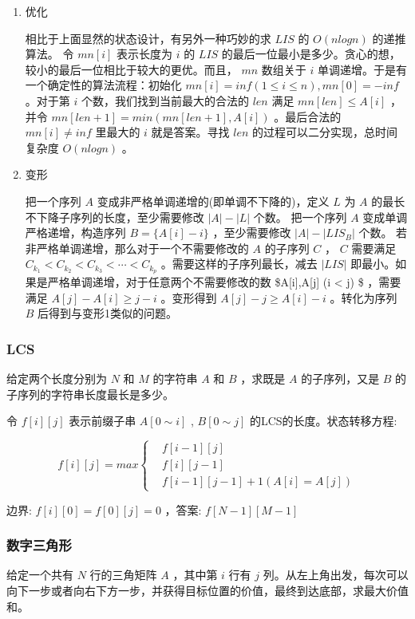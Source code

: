 \documentclass[11pt]{article}
\begin{document}
\begin{enumerate}
\item 优化
\label{sec-2-3-1-1}

相比于上面显然的状态设计，有另外一种巧妙的求 $LIS$ 的 $O(nlogn)$ 的递推算法。
令 $mn[i]$ 表示长度为 $i$ 的 $LIS$ 的最后一位最小是多少。贪心的想，较小的最后一位相比于较大的更优。而且， $mn$ 数组关于 $i$ 单调递增。于是有一个确定性的算法流程：初始化 $mn[i]=inf(1 \leq i \leq n),mn[0]=-inf$ 。对于第 $i$ 个数，我们找到当前最大的合法的 $len$ 满足 $mn[len] \leq A[i]$ ，并令 $mn[len+1]=min(mn[len+1],A[i])$ 。最后合法的 $mn[i] \neq inf$ 里最大的 $i$ 就是答案。寻找 $len$ 的过程可以二分实现，总时间复杂度 $O(nlogn)$ 。

\item 变形
\label{sec-2-3-1-2}

把一个序列 $A$ 变成非严格单调递增的(即单调不下降的)，定义 $L$ 为 $A$ 的最长不下降子序列的长度，至少需要修改 $|A|-|{L}|$ 个数。
把一个序列 $A$ 变成单调严格递增，构造序列 $B=\{A[i]-i\}$ ，至少需要修改 $|A|-|{LIS_B}|$ 个数。
若非严格单调递增，那么对于一个不需要修改的 $A$ 的子序列 $C$ ， $C$  需要满足 $C_{k_1} < C_{k_2} < C_{k_3} < \cdots < C_{k_p}$ 。需要这样的子序列最长，减去 $|LIS|$ 即最小。如果是严格单调递增，对于任意两个不需要修改的数 \$A[i],A[j] (i < j) \$ ，需要满足 $A[j]-A[i] \geq j-i$ 。变形得到 $A[j]-j \geq A[i]-i$ 。转化为序列 $B$ 后得到与变形1类似的问题。
\end{enumerate}
\subsubsection{LCS}
\label{sec-2-3-2}

给定两个长度分别为 $N$ 和 $M$ 的字符串 $A$ 和 $B$ ，求既是 $A$ 的子序列，又是 $B$ 的子序列的字符串长度最长是多少。

令 $f[i][j]$ 表示前缀子串 $A[0 \sim i]$ , $B[0 \sim j]$ 的LCS的长度。状态转移方程:

$$
f[i][j]=max\left\{\begin{aligned}
&f[i-1][j]\\
&f[i][j-1]\\
&f[i-1][j-1]+1 (A[i]=A[j])
\end{aligned}\right. 
$$

边界: $f[i][0]=f[0][j]=0$ ，答案: $f[N-1][M-1]$ 
\subsubsection{数字三角形}
\label{sec-2-3-3}

给定一个共有 $N$ 行的三角矩阵 $A$ ，其中第 $i$ 行有 $j$ 列。从左上角出发，每次可以向下一步或者向右下方一步，并获得目标位置的价值，最终到达底部，求最大价值和。
\end{document}
